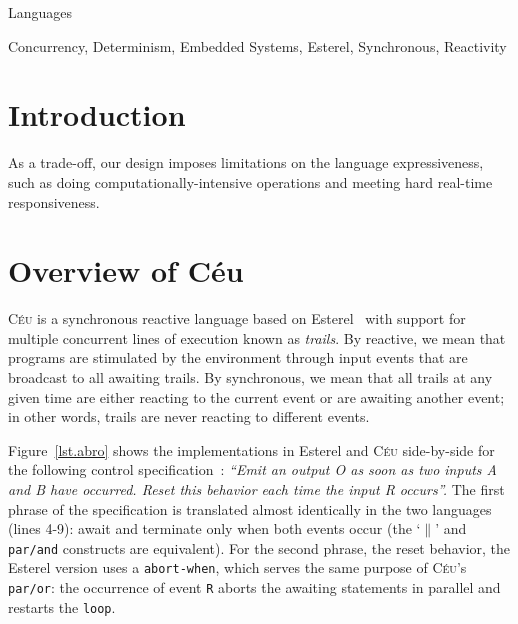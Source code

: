 \documentclass{sigplanconf}
\newcommand{\CEU}{\textsc{C\'{e}u}\xspace}
\newcommand{\code}[1] {{\small{\texttt{#1}}}}
\newcommand{\1}{\;}
\newcommand{\2}{\;\;}
\newcommand{\3}{\;\;\;}
\newcommand{\5}{\;\;\;\;\;}
\begin{document}

\terms
Languages

\keywords
Concurrency, Determinism, Embedded Systems,
Esterel, Synchronous, Reactivity

\section{Introduction}

As a trade-off, our design imposes limitations on the language expressiveness, 
such as doing computationally-intensive operations and meeting hard real-time 
responsiveness.

\section{Overview of C\'eu}
\label{sec.ceu}

\CEU is a synchronous reactive language based on Esterel~\cite{esterel.ieee91} 
with support for multiple concurrent lines of execution known as \emph{trails}.
By reactive, we mean that programs are stimulated by the environment through 
input events that are broadcast to all awaiting trails.
By synchronous, we mean that all trails at any given time are either reacting 
to the current event or are awaiting another event;
in other words, trails are never reacting to different events.

Figure~\ref{lst.abro} shows the implementations in Esterel and \CEU 
side-by-side for the following control specification~\cite{esterel.primer}:
%
\emph{``Emit an output O as soon as two inputs A and B have occurred.
Reset this behavior each time the input R occurs''.}
%
The first phrase of the specification is translated almost identically in the 
two languages (lines 4-9): await and terminate only when both events occur
(the `$\|$' and \code{par/and} constructs are equivalent).
%
For the second phrase, the reset behavior, the Esterel version uses a 
\code{abort-when}, which serves the same purpose of \CEU's \code{par/or}:
the occurrence of event \code{R} aborts the awaiting statements in parallel and 
restarts the \code{loop}.
\end{document}
